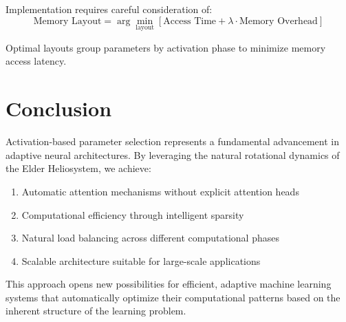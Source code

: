 Implementation requires careful consideration of:
\begin{equation}
\text{Memory Layout} = \arg\min_{\text{layout}} \left[\text{Access Time} + \lambda \cdot \text{Memory Overhead}\right]
\end{equation}

Optimal layouts group parameters by activation phase to minimize memory access latency.

\section{Conclusion}

Activation-based parameter selection represents a fundamental advancement in adaptive neural architectures. By leveraging the natural rotational dynamics of the Elder Heliosystem, we achieve:

\begin{enumerate}
    \item Automatic attention mechanisms without explicit attention heads
    \item Computational efficiency through intelligent sparsity
    \item Natural load balancing across different computational phases
    \item Scalable architecture suitable for large-scale applications
\end{enumerate}

This approach opens new possibilities for efficient, adaptive machine learning systems that automatically optimize their computational patterns based on the inherent structure of the learning problem.